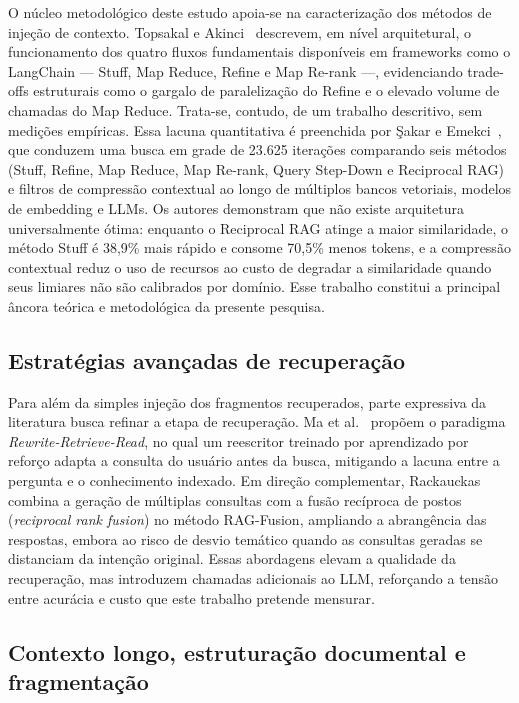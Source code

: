 O núcleo metodológico deste estudo apoia-se na caracterização dos métodos de injeção de contexto. Topsakal e Akinci~\cite{topsakal2023langchain} descrevem, em nível arquitetural, o funcionamento dos quatro fluxos fundamentais disponíveis em frameworks como o LangChain --- Stuff, Map Reduce, Refine e Map Re-rank ---, evidenciando trade-offs estruturais como o gargalo de paralelização do Refine e o elevado volume de chamadas do Map Reduce. Trata-se, contudo, de um trabalho descritivo, sem medições empíricas. Essa lacuna quantitativa é preenchida por Şakar e Emekci~\cite{sakar2025rag}, que conduzem uma busca em grade de 23.625 iterações comparando seis métodos (Stuff, Refine, Map Reduce, Map Re-rank, Query Step-Down e Reciprocal RAG) e filtros de compressão contextual ao longo de múltiplos bancos vetoriais, modelos de embedding e LLMs. Os autores demonstram que não existe arquitetura universalmente ótima: enquanto o Reciprocal RAG atinge a maior similaridade, o método Stuff é 38,9\% mais rápido e consome 70,5\% menos tokens, e a compressão contextual reduz o uso de recursos ao custo de degradar a similaridade quando seus limiares não são calibrados por domínio. Esse trabalho constitui a principal âncora teórica e metodológica da presente pesquisa.

\subsection{Estratégias avançadas de recuperação}

Para além da simples injeção dos fragmentos recuperados, parte expressiva da literatura busca refinar a etapa de recuperação. Ma et al.~\cite{ma2023query} propõem o paradigma \textit{Rewrite-Retrieve-Read}, no qual um reescritor treinado por aprendizado por reforço adapta a consulta do usuário antes da busca, mitigando a lacuna entre a pergunta e o conhecimento indexado. Em direção complementar, Rackauckas~\cite{rackauckas2024ragfusion} combina a geração de múltiplas consultas com a fusão recíproca de postos (\textit{reciprocal rank fusion}) no método RAG-Fusion, ampliando a abrangência das respostas, embora ao risco de desvio temático quando as consultas geradas se distanciam da intenção original. Essas abordagens elevam a qualidade da recuperação, mas introduzem chamadas adicionais ao LLM, reforçando a tensão entre acurácia e custo que este trabalho pretende mensurar.

\subsection{Contexto longo, estruturação documental e fragmentação}

